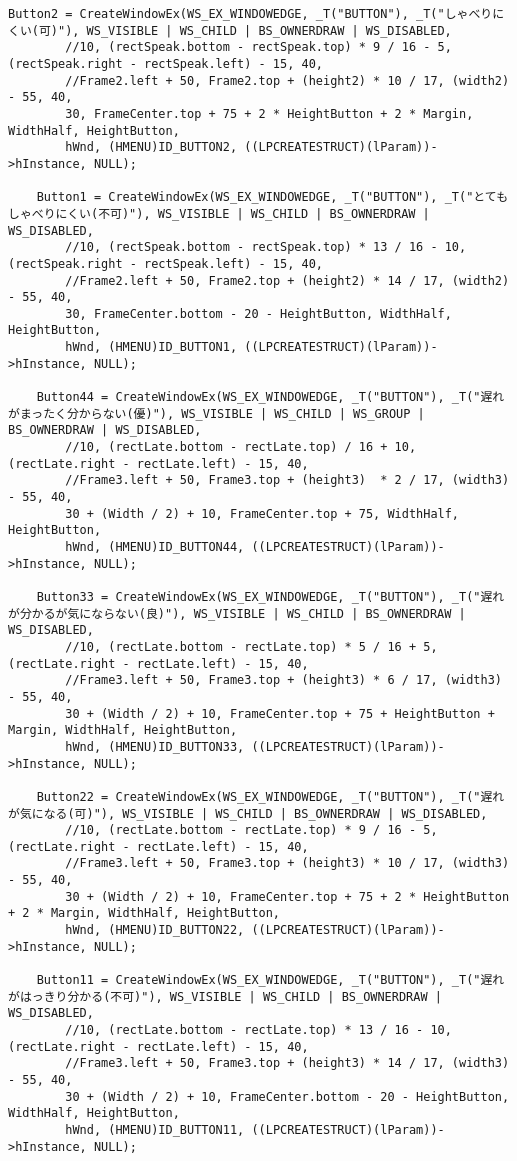 \begin{lstlisting}[caption=window.cpp]
	Button2 = CreateWindowEx(WS_EX_WINDOWEDGE, _T("BUTTON"), _T("しゃべりにくい(可)"), WS_VISIBLE | WS_CHILD | BS_OWNERDRAW | WS_DISABLED,
		//10, (rectSpeak.bottom - rectSpeak.top) * 9 / 16 - 5, (rectSpeak.right - rectSpeak.left) - 15, 40,
		//Frame2.left + 50, Frame2.top + (height2) * 10 / 17, (width2) - 55, 40,
		30, FrameCenter.top + 75 + 2 * HeightButton + 2 * Margin, WidthHalf, HeightButton,
		hWnd, (HMENU)ID_BUTTON2, ((LPCREATESTRUCT)(lParam))->hInstance, NULL);

	Button1 = CreateWindowEx(WS_EX_WINDOWEDGE, _T("BUTTON"), _T("とてもしゃべりにくい(不可)"), WS_VISIBLE | WS_CHILD | BS_OWNERDRAW | WS_DISABLED,
		//10, (rectSpeak.bottom - rectSpeak.top) * 13 / 16 - 10, (rectSpeak.right - rectSpeak.left) - 15, 40,
		//Frame2.left + 50, Frame2.top + (height2) * 14 / 17, (width2) - 55, 40,
		30, FrameCenter.bottom - 20 - HeightButton, WidthHalf, HeightButton,
		hWnd, (HMENU)ID_BUTTON1, ((LPCREATESTRUCT)(lParam))->hInstance, NULL);

	Button44 = CreateWindowEx(WS_EX_WINDOWEDGE, _T("BUTTON"), _T("遅れがまったく分からない(優)"), WS_VISIBLE | WS_CHILD | WS_GROUP | BS_OWNERDRAW | WS_DISABLED,
		//10, (rectLate.bottom - rectLate.top) / 16 + 10, (rectLate.right - rectLate.left) - 15, 40,
		//Frame3.left + 50, Frame3.top + (height3)  * 2 / 17, (width3) - 55, 40,
		30 + (Width / 2) + 10, FrameCenter.top + 75, WidthHalf, HeightButton,
		hWnd, (HMENU)ID_BUTTON44, ((LPCREATESTRUCT)(lParam))->hInstance, NULL);

	Button33 = CreateWindowEx(WS_EX_WINDOWEDGE, _T("BUTTON"), _T("遅れが分かるが気にならない(良)"), WS_VISIBLE | WS_CHILD | BS_OWNERDRAW | WS_DISABLED,
		//10, (rectLate.bottom - rectLate.top) * 5 / 16 + 5, (rectLate.right - rectLate.left) - 15, 40,
		//Frame3.left + 50, Frame3.top + (height3) * 6 / 17, (width3) - 55, 40,
		30 + (Width / 2) + 10, FrameCenter.top + 75 + HeightButton + Margin, WidthHalf, HeightButton,
		hWnd, (HMENU)ID_BUTTON33, ((LPCREATESTRUCT)(lParam))->hInstance, NULL);

	Button22 = CreateWindowEx(WS_EX_WINDOWEDGE, _T("BUTTON"), _T("遅れが気になる(可)"), WS_VISIBLE | WS_CHILD | BS_OWNERDRAW | WS_DISABLED,
		//10, (rectLate.bottom - rectLate.top) * 9 / 16 - 5, (rectLate.right - rectLate.left) - 15, 40,
		//Frame3.left + 50, Frame3.top + (height3) * 10 / 17, (width3) - 55, 40,
		30 + (Width / 2) + 10, FrameCenter.top + 75 + 2 * HeightButton + 2 * Margin, WidthHalf, HeightButton,
		hWnd, (HMENU)ID_BUTTON22, ((LPCREATESTRUCT)(lParam))->hInstance, NULL);

	Button11 = CreateWindowEx(WS_EX_WINDOWEDGE, _T("BUTTON"), _T("遅れがはっきり分かる(不可)"), WS_VISIBLE | WS_CHILD | BS_OWNERDRAW | WS_DISABLED,
		//10, (rectLate.bottom - rectLate.top) * 13 / 16 - 10, (rectLate.right - rectLate.left) - 15, 40,
		//Frame3.left + 50, Frame3.top + (height3) * 14 / 17, (width3) - 55, 40,
		30 + (Width / 2) + 10, FrameCenter.bottom - 20 - HeightButton, WidthHalf, HeightButton,
		hWnd, (HMENU)ID_BUTTON11, ((LPCREATESTRUCT)(lParam))->hInstance, NULL);


\end{lstlisting}
